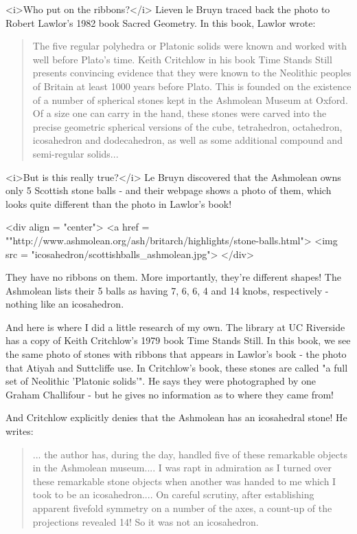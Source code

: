 <i>Who put on the ribbons?</i>  Lieven le Bruyn traced back the photo to 
Robert Lawlor's 1982 book Sacred Geometry.  In this book, Lawlor wrote:

\begin{quote}
   The five regular polyhedra or Platonic solids were known and 
   worked with well before Plato's time.  Keith Critchlow in his 
   book Time Stands Still presents convincing evidence that they 
   were known to the Neolithic peoples of Britain at least 1000 
   years before Plato.  This is founded on the existence of a number 
   of spherical stones kept in the Ashmolean Museum at Oxford. 
   Of a size one can carry in the hand, these stones were carved into 
   the precise geometric spherical versions of the cube, tetrahedron, 
   octahedron, icosahedron and dodecahedron, as well as some additional
   compound and semi-regular solids... 
\end{quote}
    

<i>But is this really true?</i>  Le Bruyn discovered that the Ashmolean owns 
only 5 Scottish stone balls - and their webpage shows a photo of them,
which looks quite different than the photo in Lawlor's book!  

<div align = "center">
<a href = ""http://www.ashmolean.org/ash/britarch/highlights/stone-balls.html">
<img src = "icosahedron/scottishballs_ashmolean.jpg">
</div>

They have no ribbons on them.  More importantly, they're different
shapes!  The Ashmolean lists their 5 balls as having 7, 6, 6, 4 and 14
knobs, respectively - nothing like an icosahedron.

And here is where I did a little research of my own.  The library 
at UC Riverside has a copy of Keith Critchlow's 1979 book Time 
Stands Still.  In this book, we see the same photo of stones with 
ribbons that appears in Lawlor's book - the photo that Atiyah and 
Suttcliffe use.  In Critchlow's book, these stones are called "a full 
set of Neolithic 'Platonic solids'".  He says they were photographed 
by one Graham Challifour - but he gives no information as to where 
they came from!

And Critchlow explicitly denies that the Ashmolean has an icosahedral
stone!  He writes:

\begin{quote}
   ... the author has, during the day, handled five of these 
   remarkable objects in the Ashmolean museum.... I was rapt 
   in admiration as I turned over these remarkable stone objects 
   when another was handed to me which I took to be an icosahedron.... 
   On careful scrutiny, after establishing apparent fivefold symmetry 
   on a number of the axes, a count-up of the projections revealed 14! 
   So it was not an icosahedron. 
\end{quote}
    

